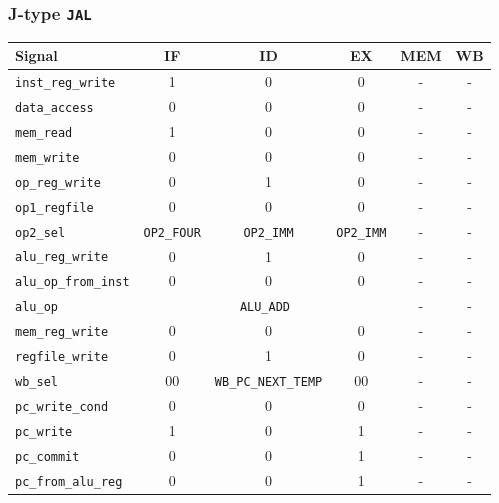 \documentclass{scrartcl}
\begin{document}
\subsubsection{J-type \texttt{JAL}}
\begin{tabularx}{\textwidth}{ | X | c | c | c | c | c | }
  \hline
  \textbf{Signal} & \textbf{IF} & \textbf{ID} & \textbf{EX} & \textbf{MEM} & \textbf{WB} \\ \hline
  \texttt{inst\_reg\_write} & 1 & 0 & 0 & - & - \\ \hline
  \texttt{data\_access} & 0 & 0 & 0 & - & - \\ \hline
  \texttt{mem\_read} & 1 & 0 & 0 & - & - \\ \hline
  \texttt{mem\_write} & 0 & 0 & 0 & - & - \\ \hline
  \texttt{op\_reg\_write} & 0 & 1 & 0 & - & - \\ \hline
  \texttt{op1\_regfile} & 0 & 0 & 0 & - & - \\ \hline
  \texttt{op2\_sel} & \texttt{OP2\_FOUR} & \texttt{OP2\_IMM} & \texttt{OP2\_IMM} & - & - \\ \hline
  \texttt{alu\_reg\_write} & 0 & 1 & 0 & - & - \\ \hline
  \texttt{alu\_op\_from\_inst} & 0 & 0 & 0 & - & - \\ \hline
  \texttt{alu\_op} & \multicolumn{3}{c|}{\texttt{ALU\_ADD}} & - & - \\ \hline
  \texttt{mem\_reg\_write} & 0 & 0 & 0 & - & - \\ \hline
  \texttt{regfile\_write} & 0 & 1 & 0 & - & - \\ \hline
  \texttt{wb\_sel} & 00 & \texttt{WB\_PC\_NEXT\_TEMP} & 00 & - & - \\ \hline
  \texttt{pc\_write\_cond} & 0 & 0 & 0 & - & - \\ \hline
  \texttt{pc\_write} & 1 & 0 & 1 & - & - \\ \hline
  \texttt{pc\_commit} & 0 & 0 & 1 & - & - \\ \hline
  \texttt{pc\_from\_alu\_reg} & 0 & 0 & 1 & - & - \\ \hline
\end{tabularx}
\end{document}
